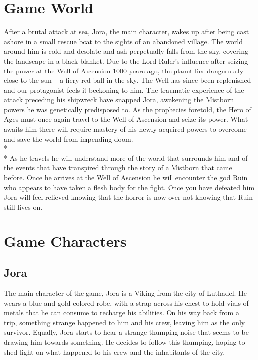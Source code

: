 \documentclass{article}
\begin{document}
\section{Game World}
After a brutal attack at sea, Jora, the main character, wakes up after being cast ashore in a small rescue boat to the sights of an abandoned village. The world around him is cold and desolate and ash perpetually falls from the sky, covering the landscape in a black blanket. Due to the Lord Ruler’s influence after seizing the power at the Well of Ascension 1000 years ago, the planet lies dangerously close to the sun – a fiery red ball in the sky. The Well has since been replenished and our protagonist feels it beckoning to him. The traumatic experience of the attack preceding his shipwreck have snapped Jora, awakening the Mistborn powers he was genetically predisposed to. As the prophecies foretold, the Hero of Ages must once again travel to the Well of Ascension and seize its power. What awaits him there will require mastery of his newly acquired powers to overcome and save the world from impending doom.
\\*\\*
 As he travels he will understand more of the world that surrounds him and of the events that have transpired through the story of a Mistborn that came before. Once he arrives at the Well of Ascension he will encounter the god Ruin who appears to have taken a flesh body for the fight. Once you have defeated him Jora will feel relieved knowing that the horror is now over not knowing that Ruin still lives on.

\section{Game Characters}

\subsection{Jora}
The main character of the game, Jora is a Viking from the city of Luthadel. He wears a blue and gold colored robe, with a strap across his chest to hold vials of metals that he can consume to recharge his abilities. On his way back from a trip, something strange happened to him and his crew, leaving him as the only survivor. Equally, Jora starts to hear a strange thumping noise that seems to be drawing him towards something. He decides to follow this thumping, hoping to shed light on what happened to his crew and the inhabitants of the city.
\end{document}
